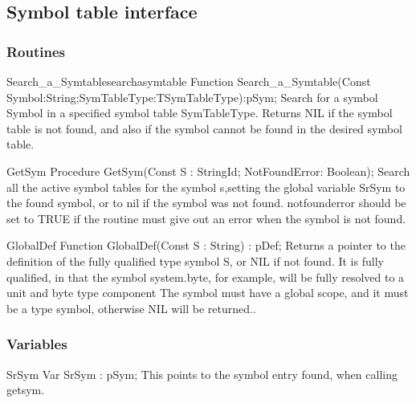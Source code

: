 \documentclass [12pt]{article}
\begin{document}
\subsection{Symbol table interface}

\subsubsection{Routines}
\label{subsubsec:routinesable}

\begin{functionl}{Search{\_}a{\_}Symtable}{searchasymtable}
\Declaration
Function Search{\_}a{\_}Symtable(Const Symbol:String;SymTableType:TSymTableType):pSym;
\Description
Search for a symbol \textsf{Symbol} in a specified symbol table
\textsf{SymTableType}. Returns \textsf{NIL} if the symbol table is not
found, and also if the symbol cannot be found in the desired symbol table.
\end{functionl}

\begin{procedure}{GetSym}
\Declaration
Procedure GetSym(Const S : StringId; NotFoundError: Boolean);
\Description
Search all the active symbol tables for the symbol \textsf{s},setting the
global variable \textsf{SrSym} to the found symbol, or to \textsf{nil} if
the symbol was not found. \textsf{notfounderror} should be set to TRUE if
the routine must give out an error when the symbol is not found.
\end{procedure}

\begin{function}{GlobalDef}
\Declaration
Function GlobalDef(Const S : String) : pDef;
\Description
Returns a pointer to the definition of the fully qualified type symbol
\textsf{S}, or \textsf{NIL} if not found.
\Notes
It is fully qualified, in that the symbol \textsf{system.byte}, for example,
will be fully resolved to a unit and byte type component The symbol must
have a global scope, and it must be a type symbol, otherwise \textsf{NIL}
will be returned..
\end{function}

\subsubsection{Variables}
\label{subsubsec:variablesly}

\begin{variable}{SrSym}
\Declaration
Var SrSym : pSym;
\Description
This points to the symbol entry found, when calling \textsf{getsym}. 
\end{variable}
\end{document}

